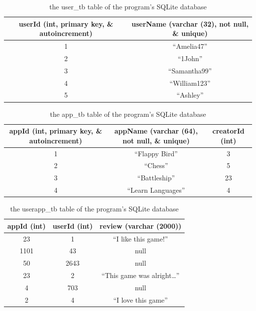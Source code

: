\documentclass{article}
\begin{document}
\begin{table}[ht!]
    \centering
    \noindent\begin{tabular}{*{2}{c}}
        \toprule
        userId (int, primary key, \& autoincrement) & userName (varchar (32), not null, \& unique)\\
        \midrule
        1 & ``Amelia47'' \\
        2 & ``1John'' \\
        3 & ``Samantha99'' \\
        4 & ``William123'' \\
        5 & ``Ashley'' \\
        \bottomrule
    \end{tabular}
    \caption{the user\_tb table of the program's SQLite database\label{table:user_tb}}
\end{table}
\begin{table}[ht!]
    \centering
    \noindent\begin{tabular}{*{3}{c}}
        \toprule
        appId (int, primary key, \& autoincrement) & appName (varchar (64), not null, \& unique) & creatorId (int)\\
        \midrule
        1 & ``Flappy Bird'' & 3 \\
        2 & ``Chess'' & 5 \\
        3 & ``Battleship'' & 23 \\
        4 & ``Learn Languages'' & 4 \\
        \bottomrule
    \end{tabular}
    \caption{the app\_tb table of the program's SQLite database\label{table:app_tb}}
\end{table}
\begin{table}[ht!]
    \centering
    \noindent\begin{tabular}{*{3}{c}}
        \toprule
        appId (int) & userId (int) & review (varchar (2000))\\
        \midrule
        23 & 1 & ``I like this game!'' \\
        1101 & 43 & null\\
        50 & 2643 & null\\
        23 & 2 & ``This game was alright\ldots'' \\
        4 & 703 & null\\
        2 & 4 & ``I love this game'' \\
        \bottomrule
    \end{tabular}
    \caption{the userapp\_tb table of the program's SQLite database\label{table:userapp_tb}}
\end{table}
\end{document}
